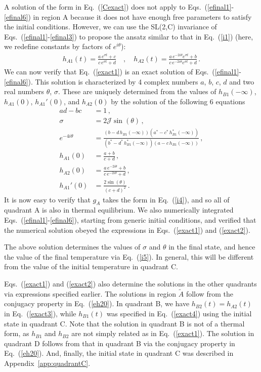 \documentclass[prx,aps,onecolumn,amsfonts,showpacs,superscriptaddress,preprint,eqsecnum]
{revtex4-1}
\newcommand{\nn}{\nonumber \\}
\begin{document}
A solution of the form in Eq.~(\ref{Cexact}) does not apply to Eqs.~(\ref{efinal1}-\ref{efinal6}) in region A because it does
not have enough free parameters to satisfy the initial conditions. However, we can use the SL(2,C) invariance of Eqs.~(\ref{efinal1}-\ref{efinal3})
to propose the ansatz similar to that in Eq.~(\ref{i1}) (here, we redefine constants by
factors of $e^{i \theta}$):
\begin{align}
h_{A1} (t) = \frac{ a \, e^{\sigma t} + c}{c \, e^{\sigma t} + d} \quad, \quad h_{A2} (t) = \frac{ a \, e^{-2 i \theta}  e^{ \sigma t} + b}{ c \, e^{-2 i \theta} e^{\sigma t} + d} \,. \label{exact1}
\end{align}
We can now verify that Eq.~(\ref{exact1}) is an exact solution of Eqs.~(\ref{efinal1}-\ref{efinal6}). This solution is characterized
by 4 complex numbers $a$, $b$, $c$, $d$ and two real numbers $\theta$, $\sigma$. These are uniquely determined 
from the values of $h_{B1} (-\infty)$, $h_{A1} (0)$, $h_{A1}' (0)$, and $h_{A2} (0)$ 
by the solution of the following 6 equations
\begin{align}
a d - b c & = 1 \,, \nn
\sigma &= 2 \mathcal{J} \sin(\theta) \,,\nn
e^{-4 i \theta} &= \frac{(b - d \, h_{B1} (- \infty))(a^\ast - c^\ast \, h_{B1}^\ast (-\infty))}{(b^\ast - d^\ast \, h_{B1}^\ast (- \infty))(a - c \, h_{B1} (-\infty))} \,, \nn
h_{A1} (0) &= \frac{ a + b}{c + d} \,, \nn
h_{A2} (0) &= \frac{ a \, e^{-2 i \theta} + b }{c \, e^{-2 i \theta} + d } \,, \nn
h_{A1}' (0) &= \frac{2 \sin(\theta)}{(c + d)^2} \,.
\label{exact2}
\end{align}
It is now easy to verify that $g_A$ takes the form in Eq.~(\ref{i4}), and so all of quadrant A is also in thermal 
equilibrium. We also numerically integrated Eqs.~(\ref{efinal1}-\ref{efinal6}), starting from generic 
initial conditions, and verified that the numerical solution obeyed the 
expressions in Eqs.~(\ref{exact1}) and (\ref{exact2}).

The above solution determines the values of $\sigma$ and $\theta$ in the final state, and hence the value of the final temperature via Eq.~(\ref{i5}). In general, this will be different from the value of the initial temperature in quadrant C.

Eqs.~(\ref{exact1}) and (\ref{exact2}) also determine the solutions in the other quadrants via expressions specified earlier. The solutions in 
region $\widetilde{A}$ follow from the conjugacy property in Eq.~(\ref{eh20}).
In quadrant B, we have $h_{B2} (t) = h_{A2} (t)$ in Eq.~(\ref{exact3}), while 
$h_{B1} (t)$ was specified in Eq.~(\ref{exact4}) using the initial state in 
quadrant C. Note that the solution in quadrant B is not of a thermal form, as $h_{B1}$ and $h_{B2}$ are
not simply related as in Eq.~(\ref{exact1}).
The solution in quadrant D follows from that in quadrant B via
the conjugacy property in Eq.~(\ref{eh20}). And, finally, the initial
state in quadrant C was described in Appendix~\ref{app:quadrantC}.
\end{document}

